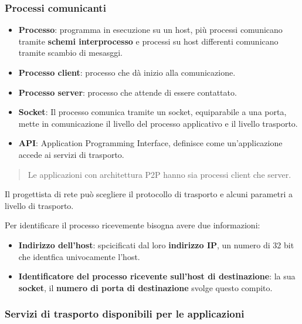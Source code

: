\subsubsection{Processi comunicanti} 
\begin{itemize}
    \item \textbf{Processo}: programma in esecuzione su un host, più processi comunicano tramite \textbf{schemi interprocesso} e processi su host differenti comunicano tramite scambio di mesasggi.
    \item \textbf{Processo client}: processo che dà inizio alla comunicazione.
    \item \textbf{Processo server}: processo che attende di essere contattato.
    \item \textbf{Socket}: Il processo comunica tramite un socket, equiparabile a una porta, mette in comunicazione il livello del processo applicativo e il livello trasporto.
    \item \textbf{API}: Application Programming Interface, definisce come un'applicazione accede ai servizi di trasporto.
\end{itemize}
\begin{quote}
    Le applicazioni con architettura P2P hanno sia processi client che server.
\end{quote}

Il progettista di rete può scegliere il protocollo di trasporto e alcuni parametri a livello di trasporto.

Per identificare il processo ricevemente bisogna avere due informazioni:
\begin{itemize}
  \item \textbf{Indirizzo dell'host}: spcicificati dal loro \textbf{indirizzo IP}, un numero di 32 bit che identfica univocamente l'host.
  \item \textbf{Identificatore del processo ricevente sull'host di destinazione}: la sua \textbf{socket}, il \textbf{numero di porta di destinazione} svolge questo compito.
\end{itemize}

\subsubsection{Servizi di trasporto disponibili per le applicazioni}

